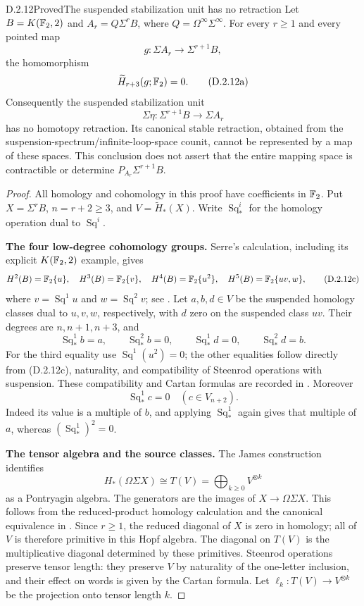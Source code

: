 \begin{claim}{D.2.12}{Proved}{The suspended stabilization unit has no retraction}
Let $B=K(\mathbb F_2,2)$ and $A_r=Q\Sigma^rB$, where
$Q=\Omega^\infty\Sigma^\infty$. For every $r\geq1$ and every
pointed map
\[
 g:\Sigma A_r\longrightarrow\Sigma^{r+1}B,
\]
the homomorphism
\[
 \widetilde H_{r+3}(g;\mathbb F_2)=0.
 \tag{D.2.12a}
\]
Consequently the suspended stabilization unit
\[
 \Sigma\eta:\Sigma^{r+1}B\longrightarrow\Sigma A_r
 \tag{D.2.12b}
\]
has no homotopy retraction. Its canonical stable retraction,
obtained from the suspension-spectrum/infinite-loop-space
counit, cannot be represented by a map of these spaces.
This conclusion does not assert that the entire mapping space
is contractible or determine $P_{A_r}\Sigma^{r+1}B$.
\end{claim}
\begin{proof}
All homology and cohomology in this proof have coefficients in
$\mathbb F_2$. Put $X=\Sigma^rB$, $n=r+2\geq3$, and
$V=\widetilde H_*(X)$. Write $\operatorname{Sq}_*^i$ for the
homology operation dual to $\operatorname{Sq}^i$.

\medskip\noindent
\textbf{The four low-degree cohomology groups.}
Serre's calculation, including its explicit $K(\mathbb F_2,2)$
example, gives
\[
 H^2(B)=\mathbb F_2\{u\},\quad
 H^3(B)=\mathbb F_2\{v\},\quad
 H^4(B)=\mathbb F_2\{u^2\},\quad
 H^5(B)=\mathbb F_2\{uv,w\},
 \tag{D.2.12c}
\]
where $v=\operatorname{Sq}^1u$ and
$w=\operatorname{Sq}^2v$; see
\cite[\S2, no.~8, Theorem~2 and no.~9, pp.~203--204]{I_Serre1953}.
Let $a,b,d\in V$ be the suspended homology classes dual to
$u,v,w$, respectively, with $d$ zero on the suspended class
$uv$. Their degrees are $n,n+1,n+3$, and
\[
 \operatorname{Sq}_*^1b=a,\qquad
 \operatorname{Sq}_*^2b=0,\qquad
 \operatorname{Sq}_*^1d=0,\qquad
 \operatorname{Sq}_*^2d=b.
 \tag{D.2.12d}
\]
For the third equality use
$\operatorname{Sq}^1(u^2)=0$; the other equalities follow
directly from \textup{(D.2.12c)}, naturality, and compatibility
of Steenrod operations with suspension. These compatibility and
Cartan formulas are recorded in
\cite[\S1, nos.~2.1--2.3, p.~199]{I_Serre1953}.
Moreover
\[
 \operatorname{Sq}_*^1c=0\quad(c\in V_{n+2}).
 \tag{D.2.12e}
\]
Indeed its value is a multiple of $b$, and applying
$\operatorname{Sq}_*^1$ again gives that multiple of $a$,
whereas $(\operatorname{Sq}_*^1)^2=0$.

\medskip\noindent
\textbf{The tensor algebra and the source classes.}
The James construction identifies
\[
 H_*(\Omega\Sigma X)\cong T(V)
       =\bigoplus_{k\geq0}V^{\otimes k}
 \tag{D.2.12f}
\]
as a Pontryagin algebra. The generators are the images of
$X\to\Omega\Sigma X$. This follows from the reduced-product
homology calculation and the canonical equivalence in
\cite[\S3, especially (3.3)--(3.4); Theorem~5.6,
Corollary~5.7 and Lemma~5.5]{I_James1955}.
Since $r\geq1$, the reduced diagonal of $X$ is zero in homology;
all of $V$ is therefore primitive in this Hopf algebra. The
diagonal on $T(V)$ is the multiplicative diagonal determined by
these primitives. Steenrod operations preserve tensor length:
they preserve $V$ by naturality of the one-letter inclusion,
and their effect on words is given by the Cartan formula.
Let $\ell_k:T(V)\to V^{\otimes k}$ be the projection onto
tensor length $k$.


\end{proof}

